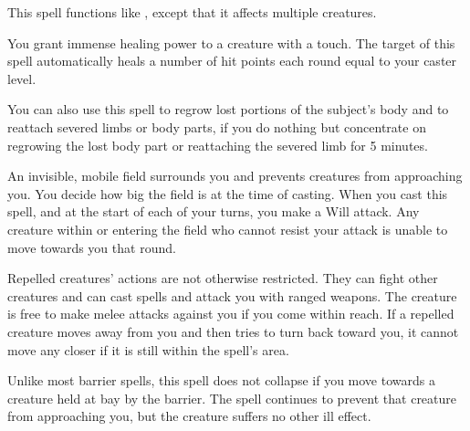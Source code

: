 \spellrng{\rngmed}
\begin{spelleffect}
  This spell functions like , except that it affects multiple creatures.
\end{spelleffect}

\spelldur{\durshort}
\begin{spelleffect}
  You grant immense healing power to a creature with a touch. The target of this spell automatically heals a number of hit points each round equal to your caster level.
  \par You can also use this spell to regrow lost portions of the subject's body and to reattach severed limbs or body parts, if you do nothing but concentrate on regrowing the lost body part or reattaching the severed limb for 5 minutes.
\end{spelleffect}

\begin{spelleffect}
  An invisible, mobile field surrounds you and prevents creatures from approaching you. You decide how big the field is at the time of casting. When you cast this spell, and at the start of each of your turns, you make a Will attack. Any creature within or entering the field who cannot resist your attack is unable to move towards you that round.
  
  Repelled creatures' actions are not otherwise restricted. They can fight other creatures and can cast spells and attack you with ranged weapons. The creature is free to make melee attacks against you if you come within reach. If a repelled creature moves away from you and then tries to turn back toward you, it cannot move any closer if it is still within the spell's area.
\end{spelleffect}
\begin{spellnotes}
  Unlike most barrier spells, this spell does not collapse if you move towards a creature held at bay by the barrier. The spell continues to prevent that creature from approaching you, but the creature suffers no other ill effect.
\end{spellnotes}

